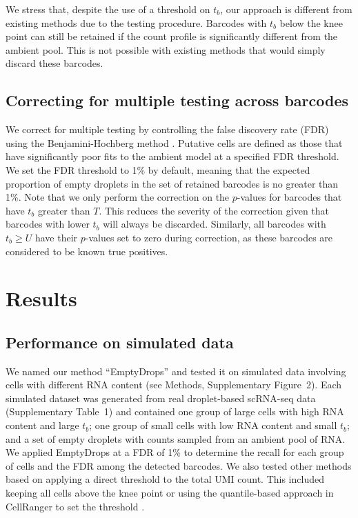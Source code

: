 \documentclass[10pt,letterpaper]{article}
\newcommand{\supptabdataset}{1}
\newcommand{\suppfigsimdesign}{2}
\begin{document}
We stress that, despite the use of a threshold on $t_b$, our approach is different from existing methods due to the testing procedure.
Barcodes with $t_b$ below the knee point can still be retained if the count profile is significantly different from the ambient pool.
This is not possible with existing methods that would simply discard these barcodes.

\subsection*{Correcting for multiple testing across barcodes}
We correct for multiple testing by controlling the false discovery rate (FDR) using the Benjamini-Hochberg method \cite{benjamini1995controlling}.
Putative cells are defined as those that have significantly poor fits to the ambient model at a specified FDR threshold.
We set the FDR threshold to 1\% by default, meaning that the expected proportion of empty droplets in the set of retained barcodes is no greater than 1\%.
Note that we only perform the correction on the $p$-values for barcodes that have $t_b$ greater than $T$.
This reduces the severity of the correction given that barcodes with lower $t_b$ will always be discarded.
Similarly, all barcodes with $t_b \ge U$ have their $p$-values set to zero during correction, as these barcodes are considered to be known true positives.

\section*{Results}

\subsection*{Performance on simulated data}
We named our method ``EmptyDrops'' and tested it on simulated data involving cells with different RNA content (see Methods, Supplementary Figure~\suppfigsimdesign{}).
Each simulated dataset was generated from real droplet-based scRNA-seq data (Supplementary Table~\supptabdataset{}) 
and contained one group of large cells with high RNA content and large $t_b$;
one group of small cells with low RNA content and small $t_b$; 
and a set of empty droplets with counts sampled from an ambient pool of RNA.
We applied EmptyDrops at a FDR of 1\% to determine the recall for each group of cells and the FDR among the detected barcodes.
We also tested other methods based on applying a direct threshold to the total UMI count.
This included keeping all cells above the knee point \cite{macosko2015highly} or using the quantile-based approach in CellRanger to set the threshold \cite{zheng2017massively}.
\end{document}
